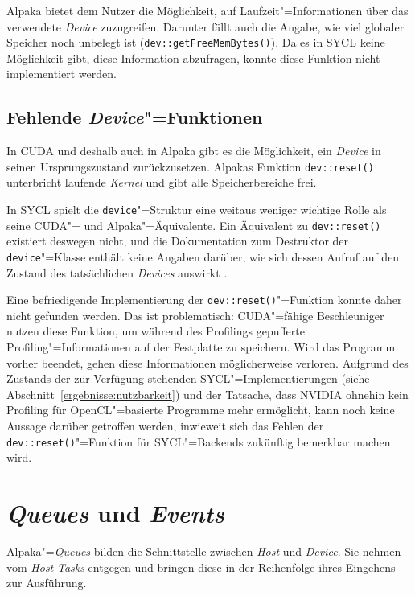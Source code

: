 Alpaka bietet dem Nutzer die Möglichkeit, auf Laufzeit"=Informationen über das
verwendete \textit{Device} zuzugreifen. Darunter fällt auch die Angabe, wie viel
globaler Speicher noch unbelegt ist (\texttt{dev::getFreeMemBytes()}). Da es in
SYCL keine Möglichkeit gibt, diese Information abzufragen, konnte diese Funktion
nicht implementiert werden.

\subsection{Fehlende \textit{Device}"=Funktionen}

In CUDA und deshalb auch in Alpaka gibt es die Möglichkeit, ein \textit{Device}
in seinen Ursprungszustand zurückzusetzen. Alpakas Funktion
\texttt{dev::reset()} unterbricht laufende \textit{Kernel} und gibt alle
Speicherbereiche frei. 

In SYCL spielt die \texttt{device}"=Struktur eine weitaus weniger wichtige
Rolle als seine CUDA"= und Alpaka"=Äquivalente. Ein Äquivalent zu
\texttt{dev::reset()} existiert deswegen nicht, und die Dokumentation zum
Destruktor der \texttt{device}"=Klasse enthält keine Angaben darüber, wie sich
dessen Aufruf auf den Zustand des tatsächlichen \textit{Devices} auswirkt
\cite[vgl.][33,41,58]{sycl2019}.

Eine befriedigende Implementierung der \texttt{dev::reset()}"=Funktion konnte
daher nicht gefunden werden. Das ist problematisch: CUDA"=fähige Beschleuniger
nutzen diese Funktion, um während des Profilings gepufferte
Profiling"=Informationen auf der Festplatte zu speichern. Wird das Programm
vorher beendet, gehen diese Informationen möglicherweise verloren. Aufgrund des
Zustands der zur Verfügung stehenden SYCL"=Implementierungen (siehe
Abschnitt~\ref{ergebnisse:nutzbarkeit}) und der Tatsache, dass NVIDIA ohnehin
kein Profiling für OpenCL"=basierte Programme mehr ermöglicht, kann noch keine
Aussage darüber getroffen werden, inwieweit sich das Fehlen der
\texttt{dev::reset()}"=Funktion für SYCL"=Backends zukünftig bemerkbar machen
wird.

\section{\textit{Queues} und \textit{Events}}
\label{implementierung:queue}

Alpaka"=\textit{Queues} bilden die Schnittstelle zwischen \textit{Host} und
\textit{Device}. Sie nehmen vom \textit{Host} \textit{Tasks} entgegen und
bringen diese in der Reihenfolge ihres Eingehens zur Ausführung.

